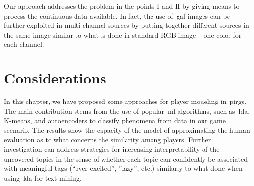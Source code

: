 Our approach addresses the problem in the points I and II by giving means to process the continuous data available. In fact, the use of~\gls{gaf} images can be further exploited in multi-channel sources by putting together different sources in the same image similar to what is done in standard RGB image -- one color for each channel. 


\section{Considerations}
In this chapter, we have proposed some approaches for player modeling in~\gls{pirg}s. The main contribution stems from the use of popular~\gls{ml} algorithms, such as~\gls{lda}, K-means, and autoencoders to classify phenomena from data in our game scenario. The results show the capacity of the model of approximating the human evaluation as to what concerns the similarity among players. Further investigation can address strategies for increasing interpretability of the uncovered topics in the sense of whether each topic can confidently be associated with meaningful tags (\eg ``over excited'', ''lazy'', etc.) similarly to what done when using~\gls{lda} for text mining.
